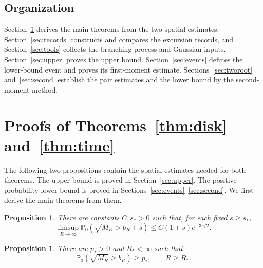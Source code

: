 \documentclass[11pt,a4paper]{article}
\numberwithin{equation}{section}
\newtheorem{proposition}[theorem]{Proposition}
\theoremstyle{remark}
\begin{document}
\subsection{Organization}\label{sec:organization}
Section~\ref{sec:mainproofs} derives the main theorems from the two spatial estimates. Section~\ref{sec:records} constructs and compares the excursion records, and Section~\ref{sec:tools} collects the branching-process and Gaussian inputs. Section~\ref{sec:upper} proves the upper bound. Section~\ref{sec:events} defines the lower-bound event and proves its first-moment estimate. Sections~\ref{sec:tworoot} and~\ref{sec:second} establish the pair estimates and the lower bound by the second-moment method.

\section{Proofs of Theorems~\ref{thm:disk} and~\ref{thm:time}}\label{sec:mainproofs}
The following two propositions contain the spatial estimates needed for both theorems. The upper bound is proved in Section~\ref{sec:upper}. The positive-probability lower bound is proved in Sections~\ref{sec:events}--\ref{sec:second}. We first derive the main theorems from them.

\begin{proposition}\label{prop:upper}
There are constants $C,s_*>0$ such that, for each fixed $s\ge s_*$,
\[
\limsup_{R\to\infty}\mathbb P_0(\sqrt{M_R}>b_R+s)
\le C(1+s)e^{-3s/2}.
\]
\end{proposition}

\begin{proposition}\label{prop:seed}
There are $p_*>0$ and $R_*<\infty$ such that
\begin{equation}\label{eq:1.5}
\mathbb P_0(\sqrt{M_R}\ge b_R)\ge p_*,\qquad R\ge R_*.
\end{equation}
\end{proposition}
\end{document}
